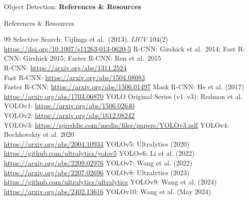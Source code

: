 \begin{frame}{}
    \LARGE Object Detection: \textbf{References \& Resources}
\end{frame}

\begin{frame}[allowframebreaks]{References \& Resources}
    \begin{thebibliography}{99}
            Selective Search: Uijlings et al.\ (2013), \emph{IJCV} 104(2) \\
            \url{https://doi.org/10.1007/s11263-013-0620-5}
            R-CNN: Girshick et al.\ 2014; Fast R-CNN: Girshick 2015; Faster R-CNN: Ren et al.\ 2015 \\
            R-CNN: \url{https://arxiv.org/abs/1311.2524} \\
            Fast R-CNN: \url{https://arxiv.org/abs/1504.08083} \\
            Faster R-CNN: \url{https://arxiv.org/abs/1506.01497}
            Mask R-CNN: He et al. (2017) \\
            \url{https://arxiv.org/abs/1703.06870}
            YOLO Original Series (v1--v3): Redmon et al. \\
            YOLOv1: \url{https://arxiv.org/abs/1506.02640} \\
            YOLOv2: \url{https://arxiv.org/abs/1612.08242} \\
            YOLOv3: \url{https://pjreddie.com/media/files/papers/YOLOv3.pdf}
            YOLOv4: Bochkovskiy et al. 2020 \\
            \url{https://arxiv.org/abs/2004.10934}
            YOLOv5: Ultralytics (2020) \\
            \url{https://github.com/ultralytics/yolov5}
            YOLOv6: Li et al. (2022) \\
            \url{https://arxiv.org/abs/2209.02976}
            YOLOv7: Wang et al. (2022) \\
            \url{https://arxiv.org/abs/2207.02696}
            YOLOv8: Ultralytics (2023) \\
            \url{https://github.com/ultralytics/ultralytics}
            YOLOv9: Wang et al. (2024) \\
            \url{https://arxiv.org/abs/2402.13616}
            YOLOv10: Wang et al. (May 2024) \\

\end{thebibliography}
\end{frame}
